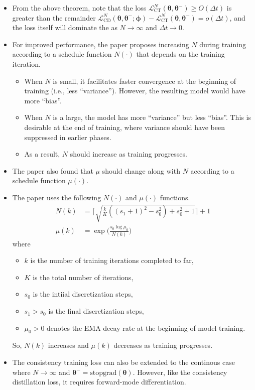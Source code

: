 \documentclass[10pt]{article}
\newcommand{\ves}[1]{\boldsymbol{#1}}
\newcommand{\mrm}[1]{\mathrm{#1}}
\newcommand{\mcal}[1]{\mathcal{#1}}
\begin{document}
\begin{itemize}
  \item From the above theorem, note that the loss $\mcal{L}^N_{\mrm{CT}}(\ves{\theta},\ves{\theta}^-) \geq O(\Delta t)$ is greater than the remainder $\mcal{L}^N_{\mrm{CD}}(\ves{\theta}, \ves{\theta}^-; \ves{\phi}) -  \mcal{L}^N_{\mrm{CT}}(\ves{\theta},\ves{\theta}^-) = o(\Delta t)$, and the loss itself will dominate the as $N \rightarrow \infty$ and $\Delta t \rightarrow 0$.
  
  \item For improved performance, the paper proposes increasing $N$ during training according to a schedule function $N(\cdot)$ that depends on the training iteration.
  \begin{itemize}
    \item When $N$ is small, it facilitates faster convergence at the beginning of training (i.e., less ``variance''). However, the resulting model would have more ``bias''.
    \item When $N$ is a large, the model has more ``variance'' but less ``bias''. This is desirable at the end of training, where variance should have been suppressed in earlier phases.
    \item As a result, $N$ should increase as training progresses.
  \end{itemize}

  \item The paper also found that $\mu$ should change along with $N$ according to a schedule function $\mu(\cdot)$.
  
  \item The paper uses the following $N(\cdot)$ and $\mu(\cdot)$ functions.
  \begin{align*}
    N(k) &= \bigg\lceil \sqrt{\frac{k}{K}((s_1 + 1)^2 - s_0^2) + s_0^2 + 1}  \bigg\rceil  + 1 \\
    \mu(k) &=  \exp\bigg( \frac{s_0 \log \mu_0}{N(k)} \bigg)
  \end{align*}
  where
  \begin{itemize}
    \item $k$ is the number of training iterations completed to far,
    \item $K$ is the total number of iterations,
    \item $s_0$ is the intiial discretization steps,
    \item $s_1 > s_0$ is the final discretization steps,
    \item $\mu_0 > 0$ denotes the EMA decay rate at the beginning of model training.
  \end{itemize}
  So, $N(k)$ increases and $\mu(k)$ decreases as training progresses.

  \item The consistency training loss can also be extended to the continous case where $N \rightarrow \infty$ and $\ves{\theta}^- = \mrm{stopgrad}(\ves{\theta})$. However, like the consistency distillation loss, it requires forward-mode differentiation.
\end{itemize}
\end{document}
